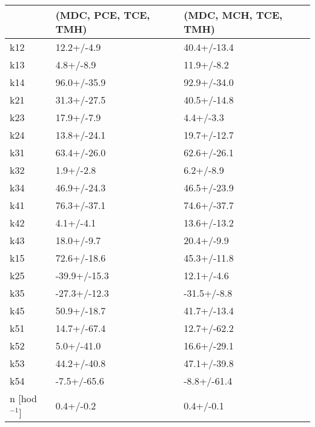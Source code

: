 \begin{tabular}{lll}
\toprule
{} & (MDC, PCE, TCE, TMH) & (MDC, MCH, TCE, TMH) \\
\midrule
k12            &           12.2+/-4.9 &          40.4+/-13.4 \\
k13            &            4.8+/-8.9 &           11.9+/-8.2 \\
k14            &          96.0+/-35.9 &          92.9+/-34.0 \\
k21            &          31.3+/-27.5 &          40.5+/-14.8 \\
k23            &           17.9+/-7.9 &            4.4+/-3.3 \\
k24            &          13.8+/-24.1 &          19.7+/-12.7 \\
k31            &          63.4+/-26.0 &          62.6+/-26.1 \\
k32            &            1.9+/-2.8 &            6.2+/-8.9 \\
k34            &          46.9+/-24.3 &          46.5+/-23.9 \\
k41            &          76.3+/-37.1 &          74.6+/-37.7 \\
k42            &            4.1+/-4.1 &          13.6+/-13.2 \\
k43            &           18.0+/-9.7 &           20.4+/-9.9 \\
k15            &          72.6+/-18.6 &          45.3+/-11.8 \\
k25            &         -39.9+/-15.3 &           12.1+/-4.6 \\
k35            &         -27.3+/-12.3 &          -31.5+/-8.8 \\
k45            &          50.9+/-18.7 &          41.7+/-13.4 \\
k51            &          14.7+/-67.4 &          12.7+/-62.2 \\
k52            &           5.0+/-41.0 &          16.6+/-29.1 \\
k53            &          44.2+/-40.8 &          47.1+/-39.8 \\
k54            &          -7.5+/-65.6 &          -8.8+/-61.4 \\
n [hod$^{-1}$] &            0.4+/-0.2 &            0.4+/-0.1 \\
\bottomrule
\end{tabular}
